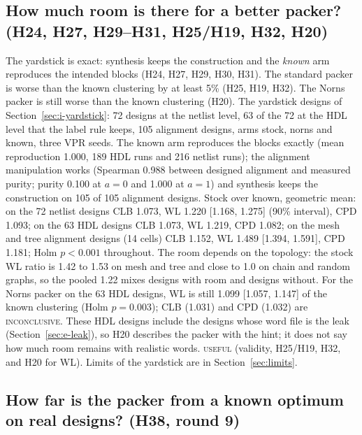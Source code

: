 \subsection{How much room is there for a better packer? (H24, H27, H29--H31, H25/H19, H32, H20)}
\label{sec:e-room}

 The yardstick is exact: synthesis keeps the construction and the \emph{known} arm reproduces the intended blocks (H24, H27, H29, H30, H31). The standard packer is worse than the known clustering by at least 5\% (H25, H19, H32). The Norns packer is still worse than the known clustering (H20).
 The yardstick designs of Section~\ref{sec:i-yardstick}: 72 designs at the netlist level, 63 of the 72 at the HDL level that the label rule keeps, 105 alignment designs, arms stock, norns and known, three VPR seeds.
 The known arm reproduces the blocks exactly (mean reproduction 1.000, 189 HDL runs and 216 netlist runs); the alignment manipulation works (Spearman 0.988 between designed alignment and measured purity; purity 0.100 at $a=0$ and 1.000 at $a=1$) and synthesis keeps the construction on 105 of 105 alignment designs. %
Stock over known, geometric mean: on the 72 netlist designs CLB 1.073, WL 1.220 [1.168, 1.275] (90\% interval), CPD 1.093; on the 63 HDL designs CLB 1.073, WL 1.219, CPD 1.082; on the mesh and tree alignment designs (14 cells) CLB 1.152, WL 1.489 [1.394, 1.591], CPD 1.181; Holm $p<0.001$ throughout. %
The room depends on the topology: the stock WL ratio is 1.42 to 1.53 on mesh and tree and close to 1.0 on chain and random graphs, so the pooled 1.22 mixes designs with room and designs without. %
For the Norns packer on the 63 HDL designs, WL is still 1.099 [1.057, 1.147] of the known clustering (Holm $p=0.003$); CLB (1.031) and CPD (1.032) are \textsc{inconclusive}. %
These HDL designs include the  designs whose word file is the leak (Section~\ref{sec:e-leak}), so H20 describes the packer with the hint; it does not say how much room remains with realistic words.
 \textsc{useful} (validity, H25/H19, H32, and H20 for WL). Limits of the yardstick are in Section~\ref{sec:limits}.

\subsection{How far is the packer from a known optimum on real designs? (H38, round 9)}
\label{sec:e-real}


